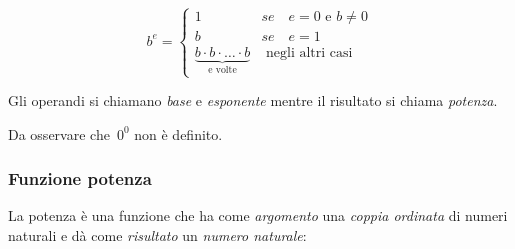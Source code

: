 \begin{inaccessibleblock}[
  \begin{definizione}{}{}
    \[
    b^e = \begin{cases}
    1 & se \quad e = 0 \text{ e } b\neq 0\\
    b & se \quad e = 1\\
    \mbox{e volte}{b \cdot b \cdot \dots \cdot b} & \mbox{ 
negli altri casi}
    \end{cases}\]
  \end{definizione}
  ]
  \begin{definizione}{}{}
    \[
    b^e = \begin{cases}
    1 & se \quad e = 0 \text{ e } b\neq 0\\
    b & se \quad e = 1\\
    \underbrace{b \cdot b \cdot \dots \cdot b}_{\text{e volte}} & 
\text{ negli altri casi}
    \end{cases}\]
  \end{definizione}
\end{inaccessibleblock}


\begin{inaccessibleblock}[]
\begin{minipage}{0.80\textwidth}
 \centering
%    
\end{minipage}%
\begin{minipage}{0.15\textwidth}
 \centering
\potfun
\end{minipage}%
\end{inaccessibleblock}

Gli operandi si chiamano \emph{base} e \emph{esponente} mentre il 
risultato si chiama \emph{potenza}.

Da osservare che~\(0^0\) non è definito.

\subsubsection{Funzione potenza}

La potenza è una funzione che ha come \emph{argomento} una \emph{coppia 
ordinata} di numeri naturali e dà come \emph{risultato} un \emph{numero 
naturale}:

\vspace{.5em}
\begin{minipage}[t]{.48\textwidth}
\begin{center}
\begin{inaccessibleblock}
\end{inaccessibleblock}
\end{center}
\end{minipage}
\hfill
\begin{minipage}[t]{.48\textwidth}
\begin{center}
\begin{inaccessibleblock}
\end{inaccessibleblock}
\end{center}
\end{minipage}

